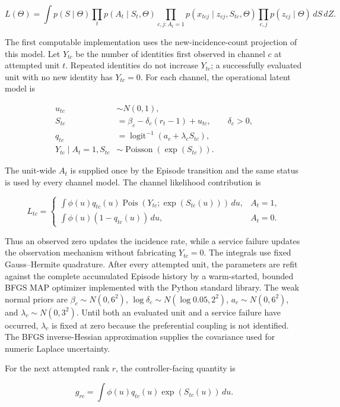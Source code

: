 \documentclass[11pt]{article}
\begin{document}
\[
L(\Theta)=\int p(S\mid\Theta)
\prod_t p(A_t\mid S_t,\Theta)
\prod_{c,j:A_t=1}p(x_{tcj}\mid z_{cj},S_{tc},\Theta)
\prod_{c,j}p(z_{cj}\mid\Theta)\,dS\,dZ.
\]

The first computable implementation uses the new-incidence-count projection of
this model.  Let $Y_{tc}$ be the number of identities first observed in
channel $c$ at attempted unit $t$.  Repeated identities do not increase
$Y_{tc}$; a successfully evaluated unit with no new identity has $Y_{tc}=0$.
For each channel, the operational latent model is

\begin{align*}
u_{tc} &\sim N(0,1),\\
S_{tc} &= \beta_c-\delta_c(r_t-1)+u_{tc},\qquad \delta_c>0,\\
q_{tc} &= \operatorname{logit}^{-1}(a_c+\lambda_cS_{tc}),\\
Y_{tc}\mid A_t=1,S_{tc} &\sim
  \operatorname{Poisson}(\exp(S_{tc})).
\end{align*}

The unit-wide $A_t$ is supplied once by the Episode transition and the same
status is used by every channel model.  The channel likelihood contribution is

\[
L_{tc}=\begin{cases}
\displaystyle\int \phi(u)q_{tc}(u)
  \operatorname{Pois}(Y_{tc};\exp(S_{tc}(u)))\,du,&A_t=1,\\[6pt]
\displaystyle\int \phi(u)(1-q_{tc}(u))\,du,&A_t=0.
\end{cases}
\]

Thus an observed zero updates the incidence rate, while a service failure
updates the observation mechanism without fabricating $Y_{tc}=0$.  The
integrals use fixed Gauss--Hermite quadrature.  After every attempted unit, the
parameters are refit against the complete accumulated Episode history by a
warm-started, bounded BFGS MAP optimizer implemented with the Python standard
library.  The weak normal priors are
$\beta_c\sim N(0,6^2)$, $\log\delta_c\sim
N(\log 0.05,2^2)$, $a_c\sim N(0,6^2)$, and
$\lambda_c\sim N(0,3^2)$.  Until both an evaluated unit and a service failure
have occurred, $\lambda_c$ is fixed at zero because the preferential coupling
is not identified.  The BFGS inverse-Hessian approximation supplies the
covariance used for numeric Laplace uncertainty.

For the next attempted rank $r$, the controller-facing quantity is

\[
g_{rc}=\int \phi(u)q_{tc}(u)\exp(S_{tc}(u))\,du.
\]
\end{document}

